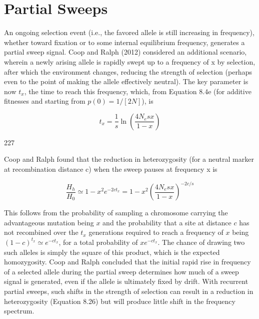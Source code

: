 \documentclass{article}
\begin{document}
\section{Partial Sweeps}
An ongoing selection event (i.e., the favored allele is still increasing in frequency), whether toward fixation or to some internal equilibrium frequency, generates a partial sweep signal. Coop and Ralph (2012) considered an additional scenario, wherein a newly arising allele is rapidly swept up to a frequency of x by selection, after which the environment changes, reducing the strength of selection (perhaps even to the point of making the allele effectively neutral). The key parameter is now  $ t_x $, the time to reach this frequency, which, from Equation 8.4e (for additive fitnesses and starting from  $ p(0) = 1/[2N] $), is

\begin{equation}
t_{x}=\frac{1}{s}\ln\left(\frac{4N_{e}s x}{1-x}\right)
\end{equation}

227

Coop and Ralph found that the reduction in heterozygosity (for a neutral marker at recombination distance c) when the sweep pauses at frequency x is

\begin{equation}
\frac{H_{h}}{H_{0}}\simeq1-x^{2}e^{-2c t_{x}}=1-x^{2}\left(\frac{4N_{e}s x}{1-x}\right)^{-2c/s}
\tag{8.15}
\label{eq:8_15}
\end{equation}

This follows from the probability of sampling a chromosome carrying the advantageous mutation being $x$ and the probability that a site at distance $c$ has not recombined over the $t_x$ generations required to reach a frequency of $x$ being $(1-c)^{t_x} \simeq e^{-ct_x}$, for a total probability of $xe^{-ct_x}$. The chance of drawing two such alleles is simply the square of this product, which is the expected homozygosity. Coop and Ralph concluded that the initial rapid rise in frequency of a selected allele during the partial sweep determines how much of a sweep signal is generated, even if the allele is ultimately fixed by drift. With recurrent partial sweeps, such shifts in the strength of selection can result in a reduction in heterozygosity (Equation 8.26) but will produce little shift in the frequency spectrum.
\end{document}
